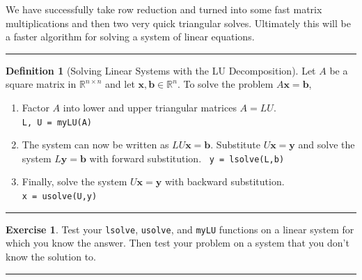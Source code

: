 \documentclass[
]{book}
\theoremstyle{definition}
\newtheorem{definition}{Definition}[chapter]
\theoremstyle{definition}
\theoremstyle{definition}
\newtheorem{exercise}{Exercise}[chapter]
\theoremstyle{remark}
\begin{document}
We have successfully take row reduction and turned into some fast matrix multiplications and then two very quick triangular solves. Ultimately this will be a faster algorithm for solving a system of linear equations.

\begin{center}\rule{0.5\linewidth}{0.5pt}\end{center}

\begin{definition}[Solving Linear Systems with the LU Decomposition]
\protect\hypertarget{def:unnamed-chunk-335}{}{\label{def:unnamed-chunk-335} {} }Let \(A\) be a square matrix in \(\mathbb{R}^{n \times n}\) and let
\(\boldsymbol{x}, \boldsymbol{b} \in \mathbb{R}^n\). To solve the problem \(A \boldsymbol{x} =\boldsymbol{b}\),

\begin{enumerate}
\def\labelenumi{\arabic{enumi}.}
\item
  Factor \(A\) into lower and upper triangular matrices \(A = LU\).\\
  \texttt{L,\ U\ =\ myLU(A)}
\item
  The system can now be written as \(LU \boldsymbol{x} = \boldsymbol{b}\). Substitute \(U \boldsymbol{x} = \boldsymbol{y}\) and solve the system \(L \boldsymbol{y} = \boldsymbol{b}\) with forward substitution.~
  \texttt{y\ =\ lsolve(L,b)}
\item
  Finally, solve the system \(U \boldsymbol{x} = \boldsymbol{y}\) with backward substitution.\\
  \texttt{x\ =\ usolve(U,y)}
\end{enumerate}
\end{definition}

\begin{center}\rule{0.5\linewidth}{0.5pt}\end{center}

\begin{exercise}
\protect\hypertarget{exr:unnamed-chunk-336}{}{\label{exr:unnamed-chunk-336} }Test your \texttt{lsolve}, \texttt{usolve}, and \texttt{myLU} functions on a linear system for which you know the answer. Then test your problem on a system that you don't know the solution to.
\end{exercise}

\begin{center}\rule{0.5\linewidth}{0.5pt}\end{center}
\end{document}
